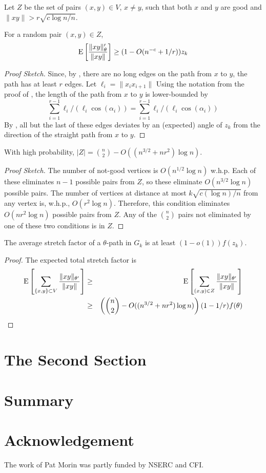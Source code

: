 \documentclass{patmorin}
\begin{document}
Let $Z$ be the set of pairs $(x,y)\in V$, $x\neq y$, such that both $x$ and $y$ are good and $\|xy\| > r\sqrt{c\log n/n}$. 

\begin{lem}
  For a random pair $(x,y)\in Z$,
  \[ 
    \mathrm{E}\left[\frac{\|xy\|_\theta'}{\|xy\|}\right] \ge (1-O(n^{-c}+1/r))z_k
  \]
\end{lem}

\begin{proof}[Proof Sketch]
  Since, by , there are no long edges on the path
  from $x$ to $y$, the path has at least $r$ edges.  
  Let $\ell_i=\|x_ix_{i+1}\|$
  Using the notation from the proof of , the length of the path from $x$ to $y$ is lower-bounded by
\[
    \sum_{i=1}^{r-1} \ell_i/(\ell_i\cos(\alpha_i))
    = \sum_{i=1}^{r-1} \ell_i/(\ell_i\cos(\alpha_i))
\]
  By ,
  all but the last of these edges deviates by an (expected) angle of $z_k$
  from the direction of the straight path from $x$ to $y$.
\end{proof}


\begin{lem}
   With high probability, $|Z| = \binom{n}{2}-O((n^{3/2}+nr^2)\log n)$.
\end{lem}

\begin{proof}[Proof Sketch]
  The number of not-good vertices is $O(n^{1/2}\log n)$ w.h.p.  Each of
  these eliminates $n-1$ possible pairs from $Z$, so these eliminate
  $O(n^{3/2}\log n)$ possible pairs.   The number of vertices at
  distance at most $k\sqrt{c(\log n)/n}$ from any vertex is, w.h.p.,
  $O(r^2\log n)$.  Therefore, this condition eliminates $O(nr^2\log n)$
  possible pairs from $Z$.  Any of the $\binom{n}{2}$ pairs not eliminated
  by one of these two conditions is in $Z$.
\end{proof}

\begin{thm}
  The average stretch factor of a $\theta$-path in $G_k$ is
  at least $(1-o(1))f(z_k)$.
\end{thm}

\begin{proof}
   The expected total stretch factor is
  \begin{eqnarray*}
  \mathrm{E}\left[\sum_{\{x,y\} \subset V} \frac{\|xy\|_{\theta'}}{\|xy\|}\right]
  & \ge & \mathrm{E}\left[\sum_{(x,y)\in Z} \frac{\|xy\|_{\theta'}}{\|xy\|}\right] \\
  & \ge & \left(\binom{n}{2}-O((n^{3/2}+nr^2)\log n)\right)(1-1/r)f(\theta) \\
  \end{eqnarray*}
\end{proof}

\section{The Second Section}

\section{Summary}

\section*{Acknowledgement}

The work of Pat Morin was partly funded by NSERC and CFI.



\end{document}
